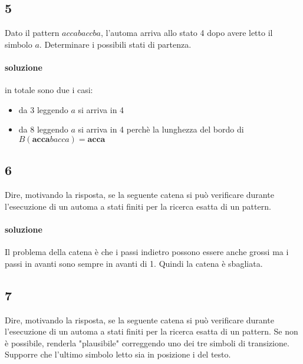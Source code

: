 \subsection{5}

Dato il pattern $accabaccba$, l'automa arriva allo stato 4 dopo avere letto il simbolo $a$. Determinare i possibili stati di partenza.

\paragraph{soluzione} in totale sono due i casi:

\begin{itemize}
    \item da 3 leggendo $a$ si arriva in 4
    \item da 8 leggendo $a$ si arriva in 4 perch\`e la lunghezza del bordo di $B(\textbf{acca}bacca) = \textbf{acca}$
\end{itemize}

\subsection{6}

Dire, motivando la risposta, se la seguente catena si pu\`o verificare durante l’esecuzione di un automa a stati finiti per la ricerca esatta di un pattern.


\paragraph{soluzione} Il problema della catena \`e che i passi indietro possono essere anche grossi ma i passi in avanti sono sempre in avanti di 1. Quindi la catena \`e sbagliata.

\subsection{7}

Dire, motivando la risposta, se la seguente catena si pu\`o verificare durante l’esecuzione di un automa a stati finiti per la ricerca esatta di un pattern. Se non \`e possibile, renderla "plausibile" correggendo uno dei tre simboli di transizione. Supporre che l’ultimo simbolo letto sia in posizione i del testo.


